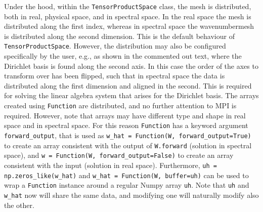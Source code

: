 \documentclass[%
oneside,                 %
final,                   %
10pt]{article}
\theoremstyle{definition}
\begin{document}
Under the hood, within the \texttt{TensorProductSpace} class, the mesh is distributed, both in real, physical space, and in spectral space. In the real space the mesh is distributed along the first index, whereas in spectral space the wavenumbermesh is distributed along the second dimension. This is the default behaviour of \texttt{TensorProductSpace}. However, the distribution may also be configured specifically by the user, e.g., as shown in the commented out text, where the Dirichlet basis is found along the second axis. In this case the order of the axes to transform over has been flipped, such that in spectral space the data is distributed along the first dimension and aligned in the second. This is required for solving the linear algebra system that arises for the Dirichlet basis. The arrays created using \texttt{Function} are distributed, and no further attention to MPI is required. However, note that arrays may have different type and shape in real space and in spectral space. For this reason \texttt{Function} has a keyword argument \Verb!forward_output!, that is used as \Verb!w_hat = Function(W, forward_output=True)! to create an array consistent with the output of \texttt{W.forward} (solution in spectral space), and \Verb!w = Function(W, forward_output=False)! to create an array consistent with the input (solution in real space). Furthermore, \Verb!uh = np.zeros_like(w_hat)! and \Verb!w_hat = Function(W, buffer=uh)! can be used to wrap a \texttt{Function} instance around a regular Numpy array \texttt{uh}. Note that \texttt{uh} and \Verb!w_hat! now will share the same data, and modifying one will naturally modify also the other. 
\end{document}
